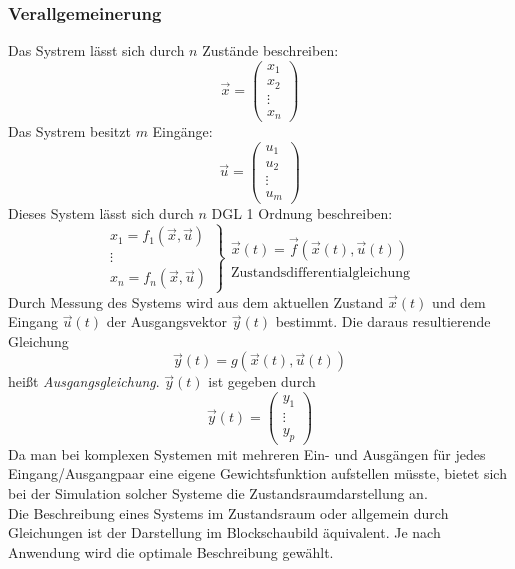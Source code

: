 \message{ !name(Mitschrieb_SysRegel.tex)}\documentclass[12pt,a4paper,ngerman]{scrartcl}
\begin{document}
\subsubsection*{Verallgemeinerung}

Das Systrem lässt sich durch $n$ Zustände beschreiben:
\[
\vec{x}=
\begin{pmatrix}
x_1\\
x_2\\
\vdots\\
x_n
\end{pmatrix}
\]
Das Systrem besitzt $m$ Eingänge:
\[
\vec{u}=
\begin{pmatrix}
u_1\\
u_2\\
\vdots\\
u_m
\end{pmatrix}
\]
Dieses System lässt sich durch $n$ DGL 1 Ordnung beschreiben:
\[
\left.
\begin{array}{cc}
x_1=f_1(\vec{x},\vec{u})\\
\vdots\\
x_n=f_n(\vec{x},\vec{u})
\end{array}
\right\}
\begin{array}{ll}
\vec{x}(t)=\vec{f}(\vec{x}(t),\vec{u}(t))\\
\text{Zustandsdifferentialgleichung}
\end{array}
\]
Durch Messung des Systems wird aus dem aktuellen Zustand $\vec{x}(t)$ und dem Eingang $\vec{u}(t)$ der Ausgangsvektor $\vec{y}(t)$ bestimmt. Die daraus resultierende Gleichung
\begin{equation*}
  \vec{y}(t)=g(\vec{x}(t),\vec{u}(t))
\end{equation*}
heißt \emph{Ausgangsgleichung}. $\vec{y}(t)$ ist gegeben durch 
\begin{equation*}
  \vec{y}(t)=
\begin{pmatrix}
y_1\\
\vdots\\
y_p
\end{pmatrix}
\end{equation*}
Da man bei komplexen Systemen mit mehreren Ein- und Ausgängen für jedes Eingang/Ausgangpaar eine eigene Gewichtsfunktion aufstellen müsste, bietet sich bei der Simulation solcher Systeme die Zustandsraumdarstellung an.\\  
Die Beschreibung eines Systems im Zustandsraum oder allgemein durch Gleichungen ist der Darstellung im Blockschaubild äquivalent. Je nach Anwendung wird die optimale Beschreibung gewählt. 
\end{document}
